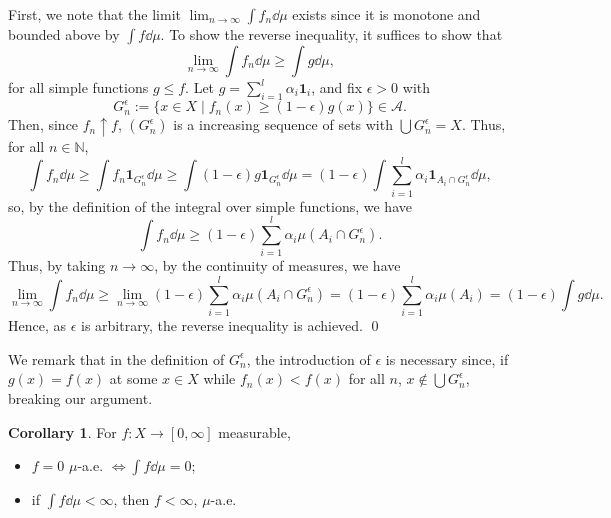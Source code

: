 \documentclass[
]{article}
\theoremstyle{definition}
\newtheorem{corollary}{Corollary}[theorem]
\theoremstyle{definition}
\begin{document}
First, we note that the limit \(\lim_{n \to \infty} \int f_n \dd \mu\)
exists since it is monotone and bounded above by \(\int f \dd \mu\). To
show the reverse inequality, it suffices to show that
\[\lim_{n \to \infty} \int f_n \dd \mu \ge \int g \dd \mu,\] for all
simple functions \(g \le f\). Let
\(g = \sum_{i = 1}^l \alpha_i \mathbf{1}_i\), and fix \(\epsilon > 0\)
with
\[G_n^\epsilon := \{x \in X \mid f_n(x) \ge (1 - \epsilon) g(x)\} \in \mathcal{A}.\]
Then, since \(f_n \uparrow f\), \((G_n^\epsilon)\) is a increasing
sequence of sets with \(\bigcup G_n^\epsilon = X\). Thus, for all
\(n \in \mathbb{N}\),
\[\int f_n \dd \mu \ge \int f_n \mathbf{1}_{G_n^\epsilon} \dd \mu \ge 
    \int (1 - \epsilon) g\mathbf{1}_{G_n^\epsilon} \dd \mu 
    = (1 - \epsilon) \int \sum_{i = 1}^l \alpha_i \mathbf{1}_{A_i \cap G_n^\epsilon} \dd \mu,\]
so, by the definition of the integral over simple functions, we have
\[\int f_n \dd \mu \ge (1 - \epsilon) \sum_{i = 1}^l \alpha_i \mu(A_i \cap G_n^\epsilon).\]
Thus, by taking \(n \to \infty\), by the continuity of measures, we have
\[\lim_{n \to \infty} \int f_n \dd \mu \ge 
    \lim_{n \to \infty} (1 - \epsilon) \sum_{i = 1}^l \alpha_i \mu(A_i \cap G_n^\epsilon)
    = (1 - \epsilon) \sum_{i = 1}^l \alpha_i \mu(A_i) = (1 - \epsilon) \int g \dd \mu.\]
Hence, as \(\epsilon\) is arbitrary, the reverse inequality is achieved.
\qed

We remark that in the definition of \(G_n^\epsilon\), the introduction
of \(\epsilon\) is necessary since, if \(g(x) = f(x)\) at some
\(x \in X\) while \(f_n(x) < f(x)\) for all \(n\),
\(x \not\in \bigcup G_n^\epsilon\), breaking our argument.

\begin{corollary}
  For \(f : X \to [0, \infty]\) measurable,
  \begin{itemize}
    \item \(f = 0\) \(\mu\)-a.e. \(\iff \int f \dd \mu = 0\);
    \item if \(\int f \dd \mu < \infty\), then \(f < \infty\), \(\mu\)-a.e.
  \end{itemize}
\end{corollary}
\proof \hspace{1mm}
\end{document}
